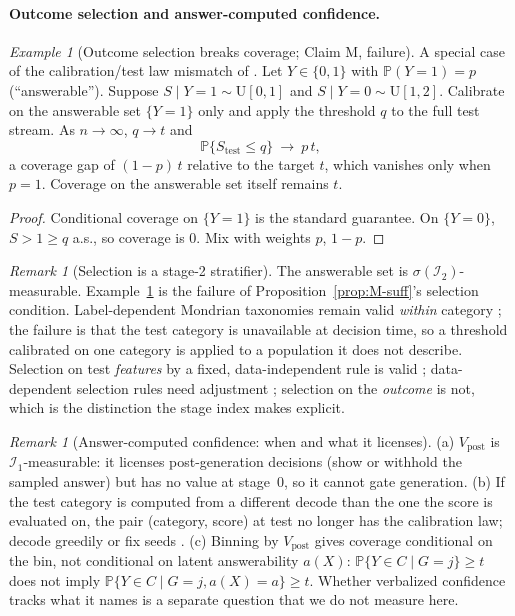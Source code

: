 \documentclass[11pt]{article}
\theoremstyle{definition}
\theoremstyle{remark}
\newtheorem{remark}[theorem]{Remark}
\newtheorem{example}[theorem]{Example}
\newcommand{\Info}{\mathcal{I}}
\renewcommand{\P}{\mathbb{P}}
\newcommand{\1}{\mathbf{1}}
\begin{document}
\paragraph{Outcome selection and answer-computed confidence.}
\begin{example}[Outcome selection breaks coverage; Claim M, failure]
\label{ex:M-fail}
A special case of the calibration/test law mismatch of \citet{wang2026trimming}. Let $Y\in\{0,1\}$ with $\P(Y=1)=p$ (``answerable''). Suppose
$S\mid Y{=}1 \sim \mathrm{U}[0,1]$ and $S\mid Y{=}0 \sim \mathrm{U}[1,2]$.
Calibrate on the answerable set $\{Y=1\}$ only and apply the threshold $q$ to the
full test stream. As $n\to\infty$, $q \to t$ and
\[
  \P\{S_{\mathrm{test}} \le q\} \ \to\ p\,t,
\]
a coverage gap of $(1-p)\,t$ relative to the target $t$,
which vanishes only when $p=1$. Coverage on the answerable set itself remains $t$.
\begin{proof}
Conditional coverage on $\{Y=1\}$ is the standard guarantee. On $\{Y=0\}$, $S>1\ge q$ a.s.,
so coverage is $0$. Mix with weights $p$, $1-p$.
\end{proof}
\end{example}

\begin{remark}[Selection is a stage-2 stratifier]
The answerable set is $\sigma(\Info_2)$-measurable. Example~\ref{ex:M-fail} is the
failure of Proposition~\ref{prop:M-suff}'s selection condition. Label-dependent Mondrian
taxonomies remain valid \emph{within} category \citep{vovk2005algorithmic}; the failure is
that the test category is unavailable at decision time, so a threshold calibrated on one
category is applied to a population it does not describe.
Selection on test \emph{features} by a fixed, data-independent rule is valid
\citep{bao2024selective}; data-dependent selection rules need adjustment \citep{jin2024confidence}; selection
on the \emph{outcome} is not, which is the distinction the stage index makes explicit.
\end{remark}

\begin{remark}[Answer-computed confidence: when and what it licenses]
\label{rem:vc}
(a) $V_{\mathrm{post}}$ is $\Info_1$-measurable: it licenses post-generation decisions
(show or withhold the sampled answer) but has no value at stage~$0$, so it cannot gate
generation. (b) If the test category is computed from a different decode than the one the
score is evaluated on, the pair (category, score) at test no longer has the calibration law;
decode greedily or fix seeds . (c) Binning by
$V_{\mathrm{post}}$ gives coverage conditional on the bin, not conditional on latent
answerability $a(X)$: $\P\{Y\in C\mid G=j\}\ge t$ does not imply
$\P\{Y\in C\mid G=j, a(X)=a\}\ge t$. Whether verbalized confidence tracks what it names is a separate
question that we do not measure here.
\end{remark}
\end{document}
